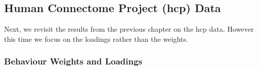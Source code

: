 %
%

\newpage
\subsection{Human Connectome Project (\acrshort{hcp}) Data}

Next, we revisit the results from the previous chapter on the \acrshort{hcp} data.
However this time we focus on the \gls{loadings} rather than the weights.

\subsubsection{Behaviour Weights and Loadings}



